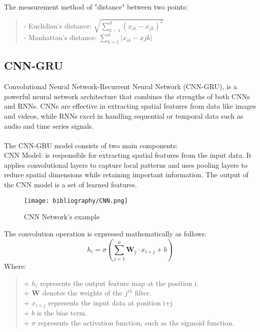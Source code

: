 \documentclass{ieeeojies}
\begin{document}
The measurement method of "distance" between two points:
\begin{quote}
- Euclidian’s distance: $\sqrt{\sum_{k-1}^d(x_{ik}-x_{jk})^2}$ \\
- Manhattan’s distance: $\sum_{k=1}^d\lvert x_{ik}-x{jk}\rvert$
\end{quote}

\subsection{CNN-GRU}
Convolutional Neural Network-Recurrent Neural Network (CNN-GRU), is a powerful neural network architecture that combines the strengths of both CNNs and RNNs. CNNs are effective in extracting spatial features from data like images and videos, while RNNs excel in handling sequential or temporal data such as audio and time series signals.\\
\vspace{1pt}\\
The CNN-GRU model consists of two main components:\\

CNN Model: is responsible for extracting spatial features from the input data. It applies convolutional layers to capture local patterns and uses pooling layers to reduce spatial dimensions while retaining important information. The output of the CNN model is a set of learned features.
\begin{figure}[H]
  \centering
  \begin{minipage}{1\linewidth}
    \centering
    \texttt{[image: bibliography/CNN.png]}
    \caption{CNN Network's example}
    \label{fig:3}
  \end{minipage}
\end{figure}
The convolution operation is expressed mathematically as follows:
\[
h_i=\sigma ( \sum_{j=1}^n \boldsymbol{W}_j \cdot x_{i+j}+b )
\]
Where:
\begin{quote}
   + $h_i$ represents the output feature map at the position i. \\
   + $\boldsymbol{W}$ denotes the weights of the $j^{th}$ filter.\\
   + $x_{i+j}$ represents the input data at position i+j\\
   + $b$ is the bias term.\\
   + $\sigma$ represents the activation function, such as the sigmoid function.\\
\end{quote}
\end{document}
